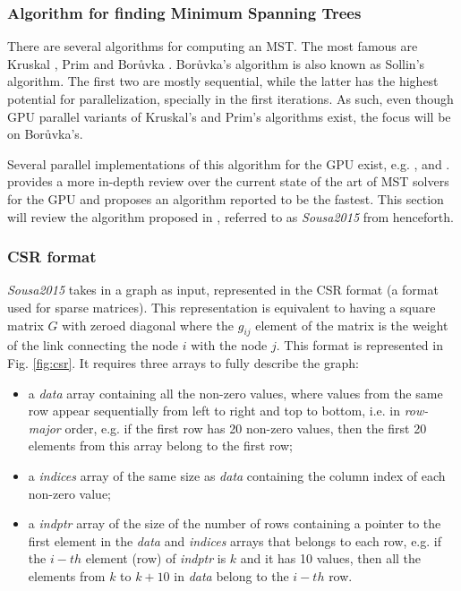 \subsubsection{Algorithm for finding Minimum Spanning Trees}
There are several algorithms for computing an MST.
The most famous are Kruskal \citep{kruskal1956shortest}, Prim \citep{prim1957shortest} and Borůvka \citep{boruuvka1926jistem}.
Borůvka's algorithm is also known as Sollin's algorithm.
The first two are mostly sequential, while the latter has the highest potential for parallelization, specially in the first iterations.
As such, even though GPU parallel variants of Kruskal's \citep{rostrup2013fast} and Prim's \citep{Wang2011} algorithms exist, the focus will be on Borůvka's.%

Several parallel implementations of this algorithm for the GPU exist, e.g. \citep{Vineet2009}, \cite{harish2009large} and \citep{Sousa2015}. \citet{Sousa2015} provides a more in-depth review over the current state of the art of MST solvers for the GPU and proposes an algorithm reported to be the fastest.
This section will review the algorithm proposed in \citep{Sousa2015}, referred to as \emph{Sousa2015} from henceforth.

\subsubsection{CSR format}
\emph{Sousa2015} takes in a graph as input, represented in the CSR format (a format used for sparse matrices).
This representation is equivalent to having a square matrix $G$ with zeroed diagonal where the $g_{ij}$ element of the matrix is the weight of the link connecting the node $i$ with the node $j$.
This format is represented in Fig. \ref{fig:csr}.
It requires three arrays to fully describe the graph:

\begin{itemize}
	\item a \emph{data} array containing all the non-zero values, where values from the same row appear sequentially from left to right and top to bottom, i.e. in \emph{row-major} order, e.g. if the first row has 20 non-zero values, then the first 20 elements from this array belong to the first row;
	\item a \emph{indices} array of the same size as \emph{data} containing the column index of each non-zero value;
	\item a \emph{indptr} array of the size of the number of rows containing a pointer to the first element in the \emph{data} and \emph{indices} arrays that belongs to each row, e.g. if the $i-th$ element (row) of \emph{indptr} is $k$ and it has 10 values, then all the elements from $k$ to $k + 10$ in \emph{data} belong to the $i-th$ row.
\end{itemize}

